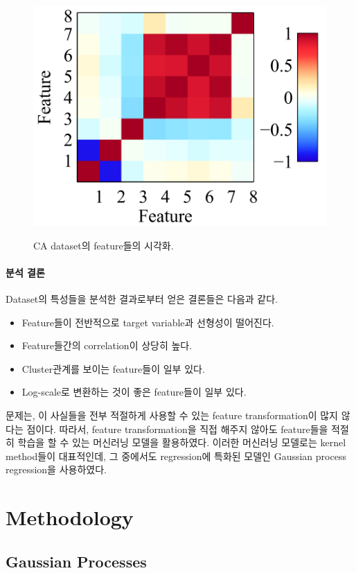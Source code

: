 \documentclass[ba, 11pt]{imsart}
\begin{document}
\begin{figure}
{    \includegraphics[scale=0.6]{figures/feature_viz_09.png}\label{fig:feqture_corr}
  }
  \caption{CA dataset의 feature들의 시각화.}\label{fig:feature}
\end{figure}

\paragraph{분석 결론}
Dataset의 특성들을 분석한 결과로부터 얻은 결론들은 다음과 같다.
\begin{itemize}
  \item Feature들이 전반적으로 target variable과 선형성이 떨어진다.
  \item Feature들간의 correlation이 상당히 높다.
  \item Cluster관계를 보이는 feature들이 일부 있다.
  \item Log-scale로 변환하는 것이 좋은 feature들이 일부 있다.
\end{itemize}
문제는, 이 사실들을 전부 적절하게 사용할 수 있는 feature transformation이 많지 않다는 점이다.
따라서, feature transformation을 직접 해주지 않아도 feature들을 적절히 학습을 할 수 있는 머신러닝 모델을 활용하였다.
이러한 머신러닝 모델로는 kernel method들이 대표적인데, 그 중에서도 regression에 특화된 모델인 Gaussian process regression을 사용하였다.


\section{Methodology}\label{section:method}
\subsection{Gaussian Processes}\label{section:gp}
\end{document}
